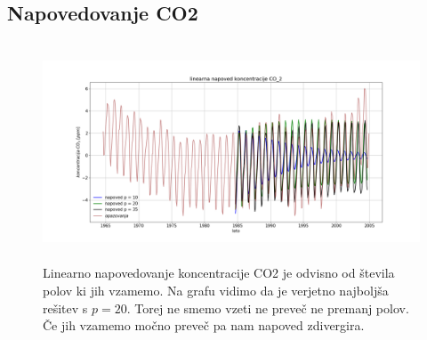 \documentclass[11pt, a4paper]{article}
\begin{document}
\subsection{Napovedovanje CO2}
\begin{figure}[H]
\centering
  \includegraphics[width=16cm,height=6.5cm]{linearna_napoved1.png}

\caption{Linearno napovedovanje koncentracije CO2 je odvisno od števila polov ki jih vzamemo. Na grafu vidimo da je verjetno najboljša rešitev s $p=20$. Torej ne smemo vzeti ne preveč ne premanj polov. Če jih vzamemo močno preveč pa nam napoved zdivergira.}
\end{figure}
\end{document}
